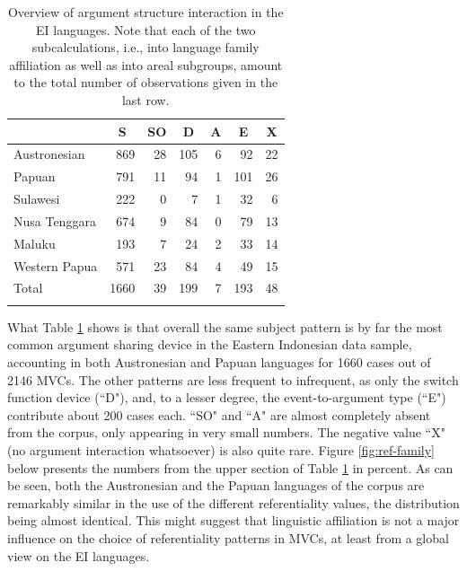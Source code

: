 \begin{table}
\begin{tabular}{lrrrrrr}
  \lsptoprule
 & \multicolumn{1}{c}{S} & \multicolumn{1}{c}{SO} & \multicolumn{1}{c}{D} & \multicolumn{1}{c}{A} & \multicolumn{1}{c}{E} & \multicolumn{1}{c}{X} \tabularnewline 
  \midrule
  Austronesian & 869 &  28 & 105 &   6 &  92 &  22 \tabularnewline
  Papuan & 791 &  11 & 94 &   1 &  101 &  26 \tabularnewline
  \midrule
  Sulawesi & 222 &   0 &  7 &   1 &  32 &   6 \tabularnewline
  Nusa Tenggara & 674 &  9 &  84 &   0 &  79 &  13 \tabularnewline 
  Maluku & 193 &   7 &  24 &   2 &   33 &  14 \tabularnewline
  Western Papua & 571 &  23 & 84 &   4 &  49 &  15 \tabularnewline 
 \midrule
 Total & 1660  & 39 & 199 &  7 & 193 &  48 \tabularnewline
   \lspbottomrule
\end{tabular}
\caption[Argument structure interaction in the EI corpus]{Overview of argument structure interaction in the EI languages. Note that each of the two subcalculations, i.e., into language family affiliation as well as into areal subgroups, amount to the total number of observations given in the last row.}
\label{table:Referentiality_overview}
\end{table}

What Table \ref{table:Referentiality_overview} shows is that overall the same subject pattern is by far the most common argument sharing device in the Eastern Indonesian data sample, accounting in both Austronesian and Papuan languages for 1660 cases out of 2146 MVCs. The other patterns are less frequent to infrequent, as only the switch function device (``D"), and, to a lesser degree, the event-to-argument type (``E") contribute about 200 cases each. ``SO" and ``A" are almost completely absent from the corpus, only appearing in very small numbers. The negative value ``X" (no argument interaction whatsoever) is also quite rare. Figure \ref{fig:ref-family} below presents the numbers from the upper section of Table \ref{table:Referentiality_overview} in percent. As can be seen, both the Austronesian and the Papuan languages of the corpus are remarkably similar in the use of the different referentiality values, the distribution being almost identical. This might suggest that linguistic affiliation is not a major influence on the choice of referentiality patterns in MVCs, at least from a global view on the EI languages.

